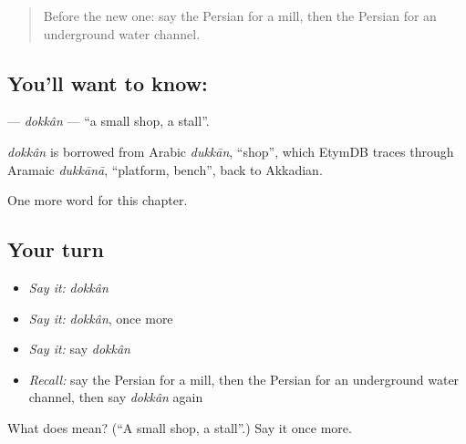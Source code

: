 \label{lesson:FA-C156-dokkan}



\begin{quote}
Before the new one: say the Persian for a mill, then the Persian for an underground water channel.
\end{quote}

\subsection*{You'll want to know: }
\textbf{} — \emph{dokkân} — \textquotedblleft{}a small shop, a stall\textquotedblright{}.

\begin{cousinweb}
\emph{dokkân} is borrowed from Arabic \emph{dukkān}, \textquotedblleft{}shop\textquotedblright{}, which EtymDB traces through Aramaic \emph{dukkānā}, \textquotedblleft{}platform, bench\textquotedblright{}, back to Akkadian.
\end{cousinweb}

\begin{grammarlens}[title={What you've built}]
One more word for this chapter.
\end{grammarlens}

\subsection*{Your turn}
\begin{itemize}
\raggedright
  \item \emph{Say it:} \emph{dokkân}
  \item \emph{Say it:} \emph{dokkân}, once more
  \item \emph{Say it:} say \emph{dokkân}
  \item \emph{Recall:} say the Persian for a mill, then the Persian for an underground water channel, then say \emph{dokkân} again
\end{itemize}

\begin{tcolorbox}[breakable,colback=teal!4,colframe=teal!35!black,title={Before you move on}]
What does  mean? (\textquotedblleft{}A small shop, a stall\textquotedblright{}.) Say it once more.
\end{tcolorbox}
